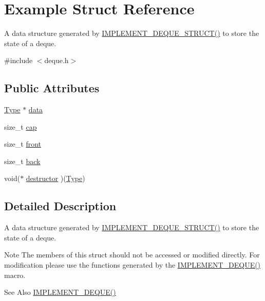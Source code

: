 \hypertarget{structExample}{\section{Example Struct Reference}
\label{structExample}
}


A data structure generated by \hyperlink{deque_8h_a091cfc1289538b13036bcd36d12a3c01}{I\-M\-P\-L\-E\-M\-E\-N\-T\-\_\-\-D\-E\-Q\-U\-E\-\_\-\-S\-T\-R\-U\-C\-T()} to store the state of a deque.  




{\ttfamily \#include $<$deque.\-h$>$}

\subsection*{Public Attributes}
\begin{DoxyCompactItemize}
\item 
\hyperlink{deque_8h_ac9c83c2070eb6b5891cf742b90f54c68}{Type} $\ast$ \hyperlink{structExample_aff9c97770bf4afc778ac2fc0c693d3b0}{data}
\item 
size\-\_\-t \hyperlink{structExample_a42fd483a97081133af34019cfb99c875}{cap}
\item 
size\-\_\-t \hyperlink{structExample_ad28f26e5c53b98255d98b65e82fae766}{front}
\item 
size\-\_\-t \hyperlink{structExample_ab52696b8c662a542dccff1fabda7de00}{back}
\item 
void($\ast$ \hyperlink{structExample_ac21bed3a8515d41511b4e54b2c46b46d}{destructor} )(\hyperlink{deque_8h_ac9c83c2070eb6b5891cf742b90f54c68}{Type})
\end{DoxyCompactItemize}


\subsection{Detailed Description}
A data structure generated by \hyperlink{deque_8h_a091cfc1289538b13036bcd36d12a3c01}{I\-M\-P\-L\-E\-M\-E\-N\-T\-\_\-\-D\-E\-Q\-U\-E\-\_\-\-S\-T\-R\-U\-C\-T()} to store the state of a deque. 

\begin{DoxyNote}{Note}
The members of this struct should not be accessed or modified directly. For modification please use the functions generated by the \hyperlink{deque_8h_a71fbe309fa88eb8d294b141f33d81233}{I\-M\-P\-L\-E\-M\-E\-N\-T\-\_\-\-D\-E\-Q\-U\-E()} macro.
\end{DoxyNote}
\begin{DoxySeeAlso}{See Also}
\hyperlink{deque_8h_a71fbe309fa88eb8d294b141f33d81233}{I\-M\-P\-L\-E\-M\-E\-N\-T\-\_\-\-D\-E\-Q\-U\-E()} 
\end{DoxySeeAlso}



